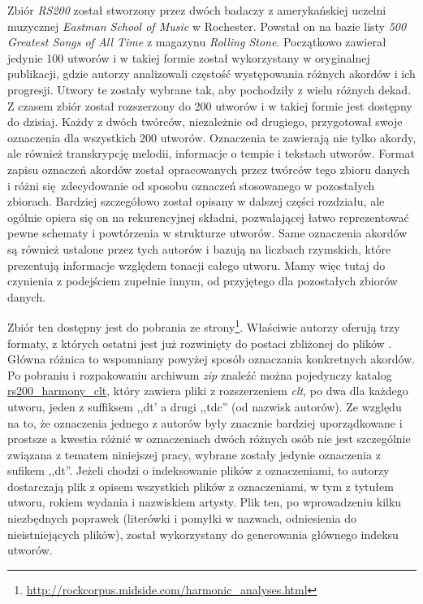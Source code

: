 Zbiór \emph{RS200} \cite{de_clercq_corpus_2011} został stworzony przez dwóch badaczy z amerykańskiej
uczelni muzycznej \emph{Eastman School of Music} w Rochester. Powstał on na bazie listy \emph{500
Greatest Songs of All Time} z magazynu \emph{Rolling Stone}. Początkowo zawierał jedynie 100 utworów i w
takiej formie został wykorzystany w oryginalnej publikacji, gdzie autorzy analizowali częstość
występowania różnych akordów i ich progresji. Utwory te zostały wybrane tak, aby pochodziły z wielu
różnych dekad. Z czasem zbiór został rozszerzony do 200 utworów i w takiej formie jest dostępny do
dzisiaj. Każdy z dwóch twórców, niezależnie od drugiego, przygotował swoje oznaczenia dla wszystkich
200 utworów. Oznaczenia te zawierają nie tylko akordy, ale również transkrypcję melodii, informacje
o tempie i tekstach utworów. Format zapisu oznaczeń akordów został opracowanych przez twórców tego
zbioru danych i różni się zdecydowanie od sposobu oznaczeń stosowanego w pozostałych zbiorach.
Bardziej szczegółowo został opisany w dalszej części rozdziału, ale ogólnie opiera się on na
rekurencyjnej składni, pozwalającej łatwo reprezentować pewne schematy i powtórzenia w strukturze
utworów. Same oznaczenia akordów są również ustalone przez tych autorów i bazują na liczbach
rzymskich, które prezentują informacje względem tonacji całego utworu. Mamy więc tutaj do
czynienia z podejściem zupełnie innym, od przyjętego dla pozostałych zbiorów danych.

Zbiór ten dostępny jest do pobrania ze strony\footnote{\url{http://rockcorpus.midside.com/harmonic_analyses.html}}. Właściwie autorzy oferują trzy
formaty, z których ostatni jest już rozwinięty do postaci zbliżonej do plików . Główna
różnica to wspomniany powyżej sposób oznaczania konkretnych akordów. Po pobraniu i rozpakowaniu archiwum
\emph{zip} znaleźć można pojedynczy katalog \url{rs200_harmony_clt}, który zawiera pliki z
rozszerzeniem \emph{clt}, po dwa dla każdego utworu, jeden z suffiksem ,,dt' a drugi ,,tdc'' (od
nazwisk autorów). Ze względu na to, że oznaczenia jednego z autorów były znacznie bardziej
uporządkowane i prostsze a kwestia różnić w oznaczeniach dwóch różnych osób nie jest szczególnie
związana z tematem niniejszej pracy, wybrane zostały jedynie oznaczenia z sufikem ,,dt''. Jeżeli
chodzi o indeksowanie plików z oznaczeniami, to autorzy dostarczają plik  z opisem
wszystkich plików z oznaczeniami, w tym z tytułem utworu, rokiem wydania i nazwiskiem artysty. Plik
ten, po wprowadzeniu kilku niezbędnych poprawek (literówki i pomyłki w nazwach, odniesienia do
nieistniejących plików), został wykorzystany do generowania głównego indeksu utworów.

